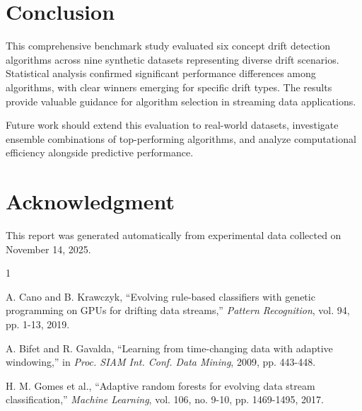 \documentclass[conference]{IEEEtran}
\begin{document}
\section{Conclusion}

This comprehensive benchmark study evaluated six concept drift detection algorithms across nine synthetic datasets representing diverse drift scenarios. Statistical analysis confirmed significant performance differences among algorithms, with clear winners emerging for specific drift types. The results provide valuable guidance for algorithm selection in streaming data applications.

Future work should extend this evaluation to real-world datasets, investigate ensemble combinations of top-performing algorithms, and analyze computational efficiency alongside predictive performance.

\section*{Acknowledgment}

This report was generated automatically from experimental data collected on November 14, 2025.

\begin{thebibliography}{1}

A. Cano and B. Krawczyk, ``Evolving rule-based classifiers with genetic programming on GPUs for drifting data streams,'' \textit{Pattern Recognition}, vol. 94, pp. 1-13, 2019.

A. Bifet and R. Gavalda, ``Learning from time-changing data with adaptive windowing,'' in \textit{Proc. SIAM Int. Conf. Data Mining}, 2009, pp. 443-448.

H. M. Gomes et al., ``Adaptive random forests for evolving data stream classification,'' \textit{Machine Learning}, vol. 106, no. 9-10, pp. 1469-1495, 2017.

\end{thebibliography}
\end{document}
